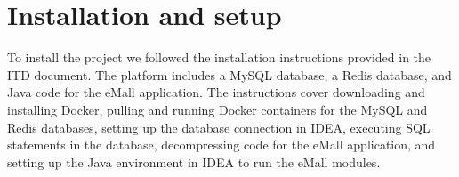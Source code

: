 \chapter{Installation and setup}
To install the project we followed the installation instructions provided in the ITD document. The platform includes a MySQL database, a Redis database, and Java code for the eMall application. The instructions cover downloading and installing Docker, pulling and running Docker containers for the MySQL and Redis databases, setting up the database connection in IDEA, executing SQL statements in the database, decompressing code for the eMall application, and setting up the Java environment in IDEA to run the eMall modules.